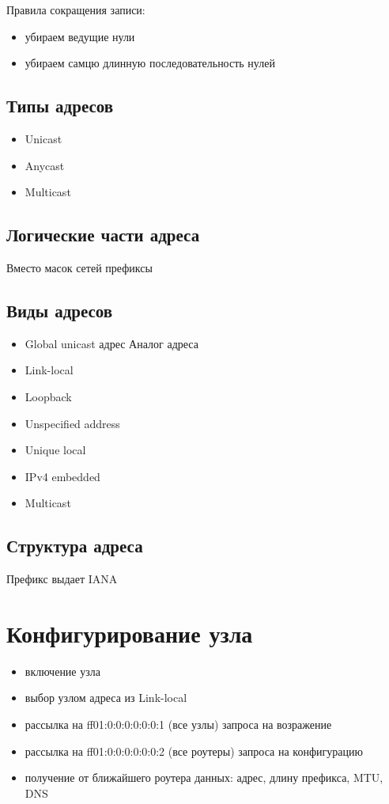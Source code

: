 \documentclass[10pt,a4paper,oneside,titlepage]{report}
\theoremstyle{defenition}
\begin{document}
Правила сокращения записи:
\begin{itemize}
	\item убираем ведущие нули
	\item убираем самцю длинную последовательность нулей
\end{itemize}

\subsection{Типы адресов}

\begin{itemize}
	\item Unicast
	\item Anycast
	\item Multicast
\end{itemize}

\subsection{Логические части адреса}

Вместо масок сетей префиксы

\subsection{Виды адресов}

\begin{itemize}
	\item Global unicast адрес
	Аналог адреса 
	\item Link-local
	\item Loopback
	\item Unspecified address
	\item Unique local
	\item IPv4 embedded
	\item Multicast
\end{itemize}

\subsection{Структура адреса}

Префикс выдает IANA

\section{Конфигурирование узла}

\begin{itemize}
	\item включение узла
	\item выбор узлом адреса из Link-local
	\item рассылка на ff01:0:0:0:0:0:0:1 (все узлы) запроса на возражение
	\item рассылка на ff01:0:0:0:0:0:0:2 (все роутеры) запроса на конфигурацию
	\item получение от ближайшего роутера данных: адрес, длину префикса, MTU, DNS
\end{itemize}
\end{document}
